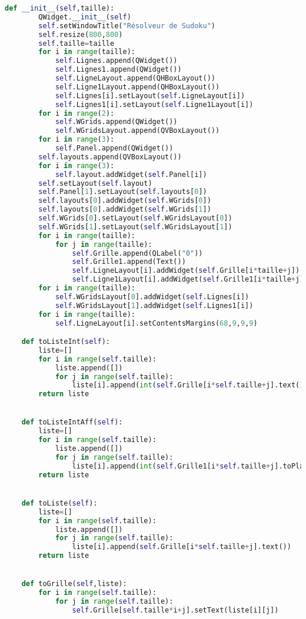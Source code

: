 \begin{lstlisting}[language=Python]
    def __init__(self,taille):
        QWidget.__init__(self)
        self.setWindowTitle("Résolveur de Sudoku")
        self.resize(800,800)
        self.taille=taille
        for i in range(taille):
            self.Lignes.append(QWidget())
            self.Lignes1.append(QWidget())
            self.LigneLayout.append(QHBoxLayout())
            self.Ligne1Layout.append(QHBoxLayout())
            self.Lignes[i].setLayout(self.LigneLayout[i])
            self.Lignes1[i].setLayout(self.Ligne1Layout[i])
        for i in range(2):
            self.WGrids.append(QWidget())
            self.WGridsLayout.append(QVBoxLayout())
        for i in range(3):
            self.Panel.append(QWidget())
        self.layouts.append(QVBoxLayout())
        for i in range(3):
            self.layout.addWidget(self.Panel[i])
        self.setLayout(self.layout)
        self.Panel[1].setLayout(self.layouts[0])
        self.layouts[0].addWidget(self.WGrids[0])
        self.layouts[0].addWidget(self.WGrids[1])
        self.WGrids[0].setLayout(self.WGridsLayout[0])
        self.WGrids[1].setLayout(self.WGridsLayout[1])
        for i in range(taille):
            for j in range(taille):
                self.Grille.append(QLabel("0"))
                self.Grille1.append(Text())
                self.LigneLayout[i].addWidget(self.Grille[i*taille+j])
                self.Ligne1Layout[i].addWidget(self.Grille1[i*taille+j])
        for i in range(taille):
            self.WGridsLayout[0].addWidget(self.Lignes[i])
            self.WGridsLayout[1].addWidget(self.Lignes1[i])
        for i in range(taille):
            self.LigneLayout[i].setContentsMargins(68,9,9,9)

    def toListeInt(self):
        liste=[]
        for i in range(self.taille):
            liste.append([])
            for j in range(self.taille):
                liste[i].append(int(self.Grille[i*self.taille+j].text()))
        return liste


    def toListeIntAff(self):
        liste=[]
        for i in range(self.taille):
            liste.append([])
            for j in range(self.taille):
                liste[i].append(int(self.Grille1[i*self.taille+j].toPlainText()))
        return liste


    def toListe(self):
        liste=[]
        for i in range(self.taille):
            liste.append([])
            for j in range(self.taille):
                liste[i].append(self.Grille[i*self.taille+j].text())
        return liste


    def toGrille(self,liste):
        for i in range(self.taille):
            for j in range(self.taille):
                self.Grille[self.taille*i+j].setText(liste[i][j])


\end{lstlisting}
